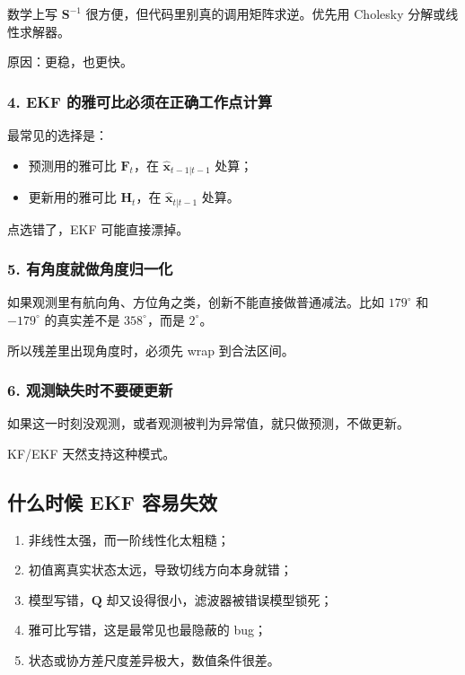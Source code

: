 \documentclass[12pt,a4paper]{ctexart}
\begin{document}
数学上写 \(\bm{S}^{-1}\) 很方便，但代码里别真的调用矩阵求逆。优先用 Cholesky 分解或线性求解器。

原因：更稳，也更快。

\subsubsection{4. EKF 的雅可比必须在正确工作点计算}

最常见的选择是：

\begin{itemize}
  \item 预测用的雅可比 \(\bm{F}_t\)，在 \(\hat{\bm{x}}_{t-1|t-1}\) 处算；
  \item 更新用的雅可比 \(\bm{H}_t\)，在 \(\hat{\bm{x}}_{t|t-1}\) 处算。
\end{itemize}

点选错了，EKF 可能直接漂掉。

\subsubsection{5. 有角度就做角度归一化}

如果观测里有航向角、方位角之类，创新不能直接做普通减法。比如 \(179^\circ\) 和 \(-179^\circ\) 的真实差不是 \(358^\circ\)，而是 \(2^\circ\)。

所以残差里出现角度时，必须先 wrap 到合法区间。

\subsubsection{6. 观测缺失时不要硬更新}

如果这一时刻没观测，或者观测被判为异常值，就只做预测，不做更新。

KF/EKF 天然支持这种模式。

\subsection{什么时候 EKF 容易失效}

\begin{enumerate}
  \item 非线性太强，而一阶线性化太粗糙；
  \item 初值离真实状态太远，导致切线方向本身就错；
  \item 模型写错，\(\bm{Q}\) 却又设得很小，滤波器被错误模型锁死；
  \item 雅可比写错，这是最常见也最隐蔽的 bug；
  \item 状态或协方差尺度差异极大，数值条件很差。
\end{enumerate}
\end{document}
